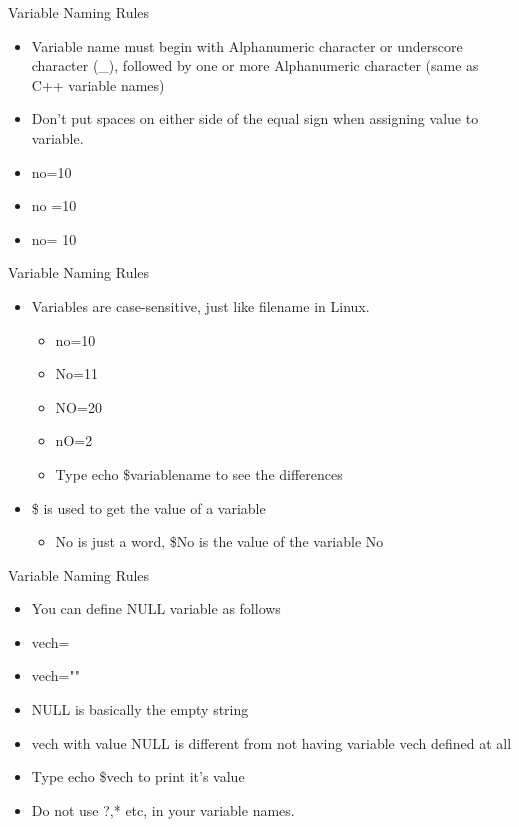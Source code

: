 \documentclass{beamer}
\begin{document}
\begin{frame}{Variable Naming Rules}
\begin{itemize}
\item Variable name must begin with Alphanumeric character or underscore character (\_), followed by one or more Alphanumeric character (same as C++ variable names)
\item Don't put spaces on either side of the equal sign when assigning value to variable.
\item no=10
\item no    =10
\item no=    10
\end{itemize}
\end{frame}

\begin{frame}{Variable Naming Rules}
\begin{itemize}
\item Variables are case-sensitive, just like filename in Linux.
\begin{itemize}
\item no=10
\item No=11
\item NO=20
\item nO=2
\item Type echo \$variablename to see the differences
\end{itemize}
\item \$ is used to get the value of a variable
\begin{itemize}
\item No is just a word, \$No is the value of the variable No
\end{itemize}
\end{itemize}
\end{frame}

\begin{frame}{Variable Naming Rules}
\begin{itemize}
\item You can define NULL variable as follows
\item vech=
\item vech=""
\item NULL is basically the empty string
\item vech with value NULL is different from not having variable vech defined at all
\item Type echo \$vech to print it's value
\item Do not use ?,* etc, in your variable names.
\end{itemize}
\end{frame}
\end{document}
